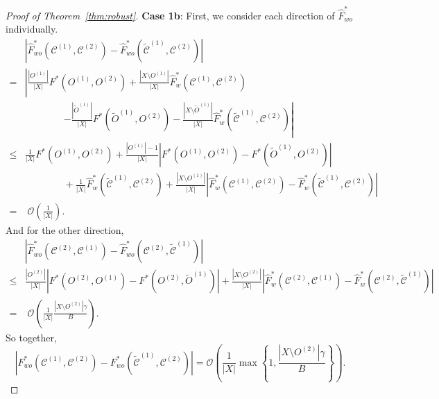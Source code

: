 \documentclass[11pt]{article}
\theoremstyle{remark}
\newcommand\cCone{\mathcal{C}^{(1)}}
\newcommand\tcCone{\tilde{\mathcal{C}}^{(1)}}
\newcommand\cCtwo{\mathcal{C}^{(2)}}
\newcommand{\bigO}{\mathcal{O}}
\begin{document}
\begin{proof}[Proof of Theorem~\ref{thm:robust}]
    \textbf{Case 1b}:
    First, we consider each direction of $\hat{F}^*_{wo}$ individually.     
    \begin{align*}
        & \left| \hat{F}^*_{wo}(\cCone, \cCtwo) - \hat{F}^*_{wo}(\tcCone, \cCtwo) \right| \\
        = & \left| \frac{|O^{(1)}|}{|X|}F^*(O^{(1)}, O^{(2)}) + \frac{|X \setminus O^{(1)}|}{|X|}\hat{F}^*_w(\cCone, \cCtwo) \right. \\
        & \qquad \qquad \left. - \frac{|\tilde{O}^{(1)}|}{|X|}F^*(\tilde{O}^{(1)}, O^{(2)}) - \frac{|X \setminus \tilde{O}^{(1)}|}{|X|}\hat{F}^*_w(\tcCone, \cCtwo) \right| \\
        \leq & \frac{1}{|X|}F^*(O^{(1)}, O^{(2)}) + \frac{|O^{(1)}|-1}{|X|}\left|F^*(O^{(1)}, O^{(2)}) - F^*(\tilde{O}^{(1)}, O^{(2)})\right| \\
        & \qquad \qquad + \frac{1}{|X|}\hat{F}^*_w(\tcCone, \cCtwo) + \frac{|X \setminus O^{(1)}|}{|X|} \left|\hat{F}^*_w(\cCone, \cCtwo) - \hat{F}^*_w(\tcCone, \cCtwo) \right| \\
        = & \; \bigO \left( \frac{1}{|X|} \right).
    \end{align*}
    And for the other direction,
    \begin{align*}
        & \left| \hat{F}^*_{wo}(\cCtwo, \cCone) - \hat{F}^*_{wo}(\cCtwo, \tcCone) \right| \\
        \leq & \frac{|O^{(2)}|}{|X|}\left| F^*(O^{(2)}, O^{(1)}) - F^*(O^{(2)}, \tilde{O}^{(1)})\right| + \frac{|X \setminus O^{(2)}|}{|X|}\left| \hat{F}^*_w(\cCtwo, \cCone) - \hat{F}^*_w(\cCtwo, \tcCone)\right|\\
        = & \; \bigO \left( \frac{1}{|X|} \frac{|X \setminus O^{(2)}| \gamma}{B}\right).
    \end{align*}
    So together,
    \begin{equation*}
        \left| F^*_{wo}(\cCone, \cCtwo) - F^*_{wo}(\tcCone, \cCtwo) \right| = \bigO \left( \frac{1}{|X|} \max \left\{ 1, \frac{|X \setminus O^{(2)}| \gamma}{B} \right\} \right).
    \end{equation*}


\end{proof}
\end{document}
